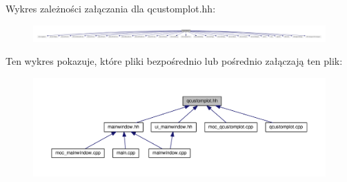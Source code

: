 Wykres zależności załączania dla qcustomplot.\+hh\+:\nopagebreak
\begin{figure}[H]
\begin{center}
\leavevmode
\includegraphics[width=350pt]{qcustomplot_8hh__incl}
\end{center}
\end{figure}
Ten wykres pokazuje, które pliki bezpośrednio lub pośrednio załączają ten plik\+:\nopagebreak
\begin{figure}[H]
\begin{center}
\leavevmode
\includegraphics[width=350pt]{qcustomplot_8hh__dep__incl}
\end{center}
\end{figure}
